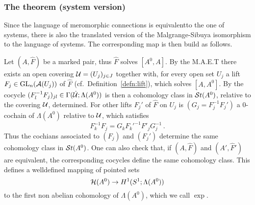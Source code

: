 \subsubsection{The theorem (system version)}
Since the language of meromorphic connections is equivalent\TODO[check!] to the
one of systems, there is also the translated version of the Malgrange-Sibuya
isomorphism to the language of systems. The corresponding map is then build as
follows.

Let $(A,\hat F)$ be a marked pair, thus $\hat F$ solves $[A^0,A]$.
By the M.A.E.T there exists an open covering $\mathcal{U}=(U_j)_{j\in J}$ together
with, for every open set $U_j$ a lift $F_j\in\operatorname{GL}_n(\mathcal{A}(U_j))$ of $\hat F$
(cf.\ Definition~\ref{defn:lift}), which solves $[A,A^0]$.
By the cocycle $(F_l^{-1}F_j)_{jl}\in\Gamma(\dot{\mathcal{U}};\Lambda(A^0))$ is then a
cohomology class in $\mathcal{S}{}t(A^0)$, relative to the covering $\mathcal{U}$, determined.
For other lifts $F_j'$ of $\hat F$ on $U_j$ is $(G_j=F_j^{-1}F_j')$ a
$0$-cochain of $\Lambda(A^0)$ relative to $\mathcal{U}$, which satisfies
\[
  F_k^{-1}F_j=G_k F_k'^{-1}F'_j G_j^{-1} \,.
\]
Thus the cochians associated to $(F_j)$ and $(F_j')$ determine the same
cohomology class in $\mathcal{S}{}t(A^0)$.
One can also check that, if $(A,\hat F)$ and $(A',\hat F')$ are equivalent, the
corresponding cocycles define the same cohomology class.
This defines a welldefined mapping of pointed sets
\[
  \mathcal{H}(A^0)\to H^1(S^1;\Lambda(A^0))
\]
to the first non abelian cohomology of $\Lambda(A^0)$, which we call $\exp$.


